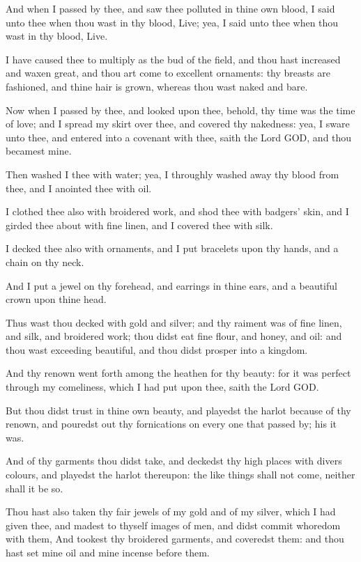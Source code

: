 \Verse And when I passed by thee, and saw thee polluted in thine own blood, I said unto thee when thou wast in thy blood, Live; yea, I said unto thee when thou wast in thy blood, Live.

\Verse I have caused thee to multiply as the bud of the field, and thou hast increased and waxen great, and thou art come to excellent ornaments: thy breasts are fashioned, and thine hair is grown, whereas thou wast naked and bare.

\Verse Now when I passed by thee, and looked upon thee, behold, thy time was the time of love; and I spread my skirt over thee, and covered thy nakedness: yea, I sware unto thee, and entered into a covenant with thee, saith the Lord GOD, and thou becamest mine.

\Verse Then washed I thee with water; yea, I throughly washed away thy blood from thee, and I anointed thee with oil.

\Verse I clothed thee also with broidered work, and shod thee with badgers' skin, and I girded thee about with fine linen, and I covered thee with silk.

\Verse I decked thee also with ornaments, and I put bracelets upon thy hands, and a chain on thy neck.

\Verse And I put a jewel on thy forehead, and earrings in thine ears, and a beautiful crown upon thine head.

\Verse Thus wast thou decked with gold and silver; and thy raiment was of fine linen, and silk, and broidered work; thou didst eat fine flour, and honey, and oil: and thou wast exceeding beautiful, and thou didst prosper into a kingdom.

\Verse And thy renown went forth among the heathen for thy beauty: for it was perfect through my comeliness, which I had put upon thee, saith the Lord GOD.

\Verse But thou didst trust in thine own beauty, and playedst the harlot because of thy renown, and pouredst out thy fornications on every one that passed by; his it was.

\Verse And of thy garments thou didst take, and deckedst thy high places with divers colours, and playedst the harlot thereupon: the like things shall not come, neither shall it be so.

\Verse Thou hast also taken thy fair jewels of my gold and of my silver, which I had given thee, and madest to thyself images of men, and didst commit whoredom with them, \Verse And tookest thy broidered garments, and coveredst them: and thou hast set mine oil and mine incense before them.

